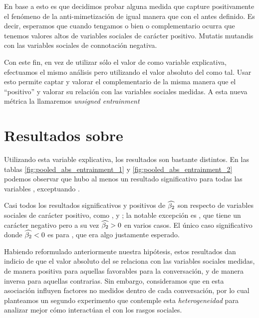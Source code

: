 En base a esto es que decidimos probar alguna medida que capture positivamente el fenómeno de la anti-mimetización de igual manera que con el \entrainment antes definido. Es decir, esperamos que cuando tengamos o bien \entrainment o \entrainment complementario ocurra que tenemos valores altos de variables sociales de carácter positivo. Mutatis mutandis con las variables sociales de connotación negativa.

Con este fin, en vez de utilizar sólo el valor de \entrainment como variable explicativa, efectuamos el mismo análisis pero utilizando el valor absoluto del \entrainment como tal. Usar esto permite captar y valorar el \entrainment complementario de la misma manera que el ``positivo'' y valorar su relación con las variables sociales medidas. A esta nueva métrica la llamaremos \emph{unsigned entrainment}

\section{Resultados sobre \absentrainment}

Utilizando esta variable explicativa, los resultados son bastante distintos. En las tablas \ref{fig:pooled_abs_entrainment_1} y \ref{fig:pooled_abs_entrainment_2} podemos observar que hubo al menos un resultado significativo para todas las variables \ap, exceptuando \PHONAVG.

Casi todos los resultados significativos y positivos de $\widehat{\beta_2}$ son respecto de variables sociales de carácter positivo, como \svclear, \svengaged y \svencourages; la notable excepción es \svdifficult, que tiene un carácter negativo pero a su vez $\widehat{\beta_2} > 0$ en varios casos. El único caso significativo donde $\widehat{\beta_2} < 0$ es para \svbored, que era algo justamente esperado.

Habiendo reformulado anteriormente nuestra hipótesis, estos resultados dan indicio de que el valor absoluto del \entrainment se relaciona con las variables sociales medidas, de manera positiva para aquellas favorables para la conversación, y de manera inversa para aquellas contrarias. Sin embargo, consideramos que en esta asociación influyen factores no medidos dentro de cada conversación, por lo cual planteamos un segundo experimento que contemple esta \emph{heterogeneidad} para analizar mejor cómo interactúan el \entrainment con los rasgos sociales.






